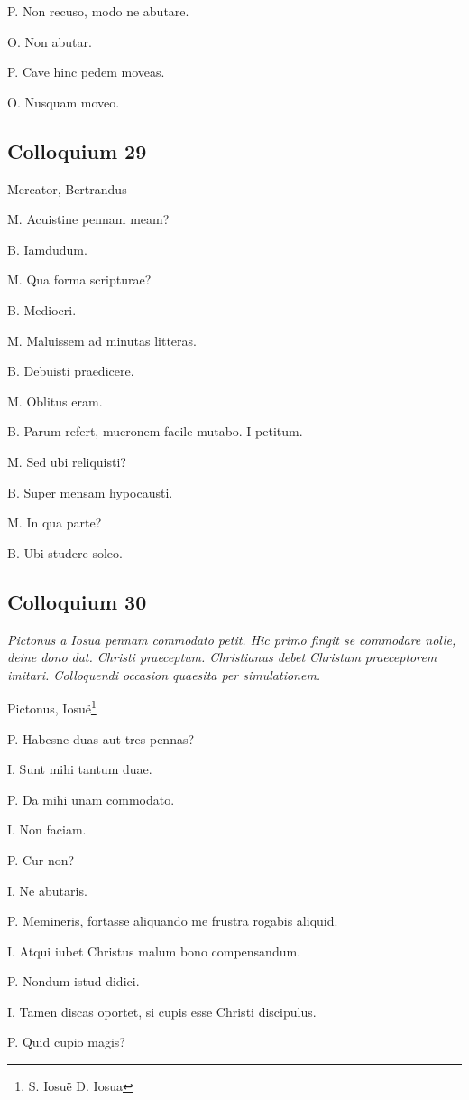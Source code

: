 \documentclass{article}
\begin{document}
P. Non recuso, modo ne abutare.

O. Non abutar.

P. Cave hinc pedem moveas.

O. Nusquam moveo.

\subsection{Colloquium 29}
Mercator, Bertrandus

M. Acuistine pennam meam?

B. Iamdudum.

M. Qua forma scripturae?

B. Mediocri.

M. Maluissem ad minutas litteras.

B. Debuisti praedicere.

M. Oblitus eram.

B. Parum refert, mucronem facile mutabo. I petitum.

M. Sed ubi reliquisti?

B. Super mensam hypocausti.

M. In qua parte?

B. Ubi studere soleo.

\subsection{Colloquium 30}
\emph{Pictonus a Iosua pennam commodato petit. Hic primo fingit se commodare nolle, deine dono dat. Christi praeceptum. Christianus debet Christum praeceptorem imitari. Colloquendi occasion quaesita per simulationem.}

Pictonus, Iosuë\footnote{S. Iosuë D. Iosua}

P. Habesne duas aut tres pennas?

I. Sunt mihi tantum duae.

P. Da mihi unam commodato.

I. Non faciam.

P. Cur non?

I. Ne abutaris.

P. Memineris, fortasse aliquando me frustra rogabis aliquid.

I. Atqui iubet Christus malum bono compensandum.

P. Nondum istud didici.

I. Tamen discas oportet, si cupis esse Christi discipulus.

P. Quid cupio magis?
\end{document}
